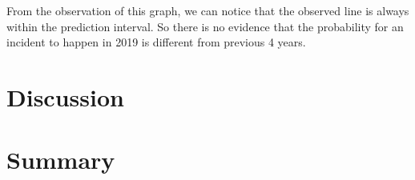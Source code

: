 \documentclass[11pt,a4paper,english]{article}
\begin{document}
From the observation of this graph, we can notice that the observed line is always within the prediction interval. So there is no evidence that the probability for an incident to happen in 2019 is different from previous 4 years.

\section{Discussion}

\section{Summary}



\end{document}
